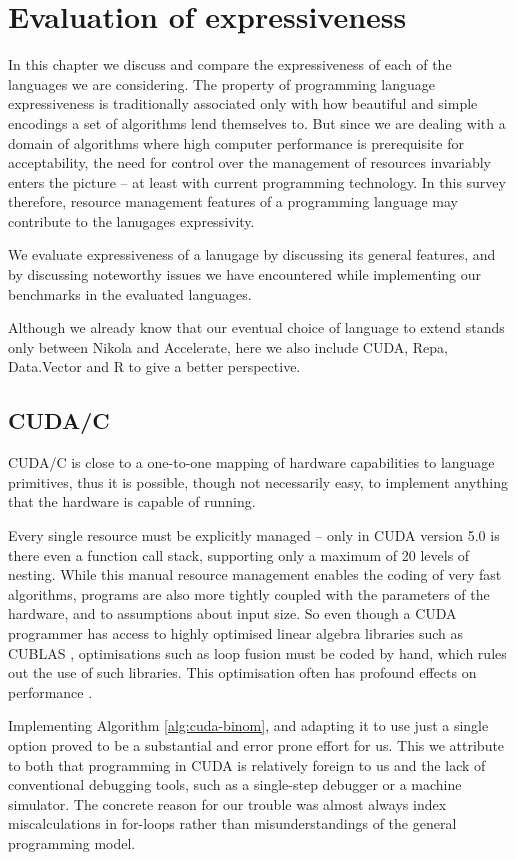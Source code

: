 \chapter{Evaluation of expressiveness}
\label{chap:expressiveness}

In this chapter we discuss and compare the expressiveness of each of the
languages we are considering.  The property of programming language
expressiveness is traditionally associated only with how beautiful and simple
encodings a set of algorithms lend themselves to. But since we are dealing with
a domain of algorithms where high computer performance is prerequisite for
acceptability, the need for control over the management of resources invariably
enters the picture -- at least with current programming technology. In this
survey therefore, resource management features of a programming language may
contribute to the lanugages expressivity.

We evaluate expressiveness of a lanugage by discussing its general features,
and by discussing noteworthy issues we have encountered while implementing our
benchmarks in the evaluated languages.

Although we already know that our eventual choice of language to extend stands
only between Nikola and Accelerate, here we also include CUDA, Repa,
Data.Vector and R to give a better perspective.

\section{CUDA/C}
CUDA/C is close to a one-to-one mapping of hardware capabilities to language
primitives, thus it is possible, though not necessarily easy, to implement anything
that the hardware is capable of running.

Every single resource must be explicitly managed -- only in CUDA version 5.0 is
there even a function call stack, supporting only a maximum of 20 levels of
nesting.  While this manual resource management enables the coding of very fast
algorithms, programs are also more tightly coupled with the parameters of the
hardware, and to assumptions about input size. So even though a CUDA programmer
has access to highly optimised linear algebra libraries such as CUBLAS
\cite{CUBLAS2013}, optimisations such as loop fusion must be coded by hand,
which rules out the use of such libraries. This optimisation often has profound
effects on performance \cite{mainlandhaskell}.

Implementing Algorithm \ref{alg:cuda-binom}, and adapting it to use just a
single option proved to be a substantial and error prone effort for us. This we
attribute to both that programming in CUDA is relatively foreign to us and the
lack of conventional debugging tools, such as a single-step debugger or a
machine simulator. The concrete reason for our trouble was almost always index
miscalculations in for-loops rather than misunderstandings of the general
programming model.

